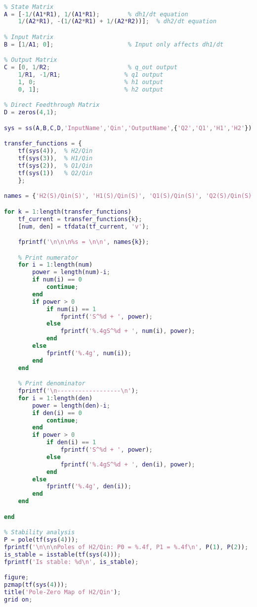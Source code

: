 \documentclass{report}
\begin{document}
\begin{flushleft}
\begin{lstlisting}[language=Matlab, caption=project code,label=lst:code]
% Assume our state is [h1, h2] , input is Qin, outputs are Q2, Q1, H1, H2

% State Matrix
A = [-1/(A1*R1), 1/(A1*R1);        % dh1/dt equation
    1/(A2*R1), -(1/(A2*R1) + 1/(A2*R2))];  % dh2/dt equation

% Input Matrix
B = [1/A1; 0];                     % Input only affects dh1/dt

% Output Matrix
C = [0, 1/R2;                      % q_out output
    1/R1, -1/R1;                  % q1 output
    1, 0;                         % h1 output
    0, 1];                        % h2 output

% Direct Feedthrough Matrix
D = zeros(4,1);

sys = ss(A,B,C,D,'InputName','Qin','OutputName',{'Q2','Q1','H1','H2'});

transfer_functions = {
    tf(sys(4)),  % H2/Qin
    tf(sys(3)),  % H1/Qin
    tf(sys(2)),  % Q1/Qin
    tf(sys(1))   % Q2/Qin
    };

names = {'H2(S)/Qin(S)', 'H1(S)/Qin(S)', 'Q1(S)/Qin(S)', 'Q2(S)/Qin(S)'};

for k = 1:length(transfer_functions)
    tf_current = transfer_functions{k};
    [num, den] = tfdata(tf_current, 'v');

    fprintf('\n\n\n%s = \n\n', names{k});

    % Print numerator
    for i = 1:length(num)
        power = length(num)-i;
        if num(i) == 0
            continue;
        end
        if power > 0
            if num(i) == 1
                fprintf('S^%d + ', power);
            else
                fprintf('%.4gS^%d + ', num(i), power);
            end
        else
            fprintf('%.4g', num(i));
        end
    end

    % Print denominator
    fprintf('\n------------------\n');
    for i = 1:length(den)
        power = length(den)-i;
        if den(i) == 0
            continue;
        end
        if power > 0
            if den(i) == 1
                fprintf('S^%d + ', power);
            else
                fprintf('%.4gS^%d + ', den(i), power);
            end
        else
            fprintf('%.4g', den(i));
        end
    end

end

% Stability analysis
P = pole(tf(sys(4)));
fprintf('\n\n\nPoles of H2/Qin: P0 = %.4f, P1 = %.4f\n', P(1), P(2));
is_stable = isstable(tf(sys(4)));
fprintf('Is stable: %d\n', is_stable);

figure;
pzmap(tf(sys(4)));
title('Pole-Zero Map of H2/Qin');
grid on;


\end{lstlisting}
\end{flushleft}
\end{document}
